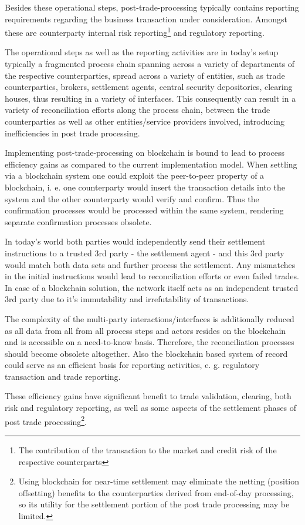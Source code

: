 Besides these operational steps, post-trade-processing typically contains reporting requirements regarding the business transaction under consideration. Amongst these are counterparty internal risk reporting\footnote{The contribution of the transaction to the market and credit risk of the respective counterparts} and regulatory reporting. 

The operational steps as well as the reporting activities are in today’s setup typically a fragmented process chain spanning across a variety of departments of the respective counterparties, spread across a variety of entities, such as trade counterparties, brokers, settlement agents, central security depositories, clearing houses, thus resulting in a variety of interfaces. This consequently can result in a variety of reconciliation efforts along the process chain, between the trade counterparties as well as other entities/service providers involved, introducing inefficiencies in post trade processing.

Implementing post-trade-processing on blockchain is bound to lead to process efficiency gains as compared to the current implementation model. When settling via a blockchain system one could exploit the peer-to-peer property of a blockchain, i. e. one counterparty would insert the transaction details into the system and the other counterparty would verify and confirm.  Thus the confirmation processes would be processed within the same system, rendering separate confirmation processes obsolete.

In today’s world both parties would independently send their settlement instructions to a trusted 3rd party - the settlement agent - and this 3rd party would match both data sets and further process the settlement. Any mismatches in the initial instructions would lead to reconciliation efforts or even failed trades. In case of a blockchain solution, the network itself acts as an independent trusted 3rd party due to it's immutability and irrefutability of transactions.

The complexity of the multi-party interactions/interfaces is additionally reduced as all data from all from all process steps and actors resides on the blockchain and is accessible on a need-to-know basis. Therefore, the reconciliation processes should become obsolete altogether. Also the blockchain based system of record could serve as an efficient basis for reporting activities, e. g. regulatory transaction and trade reporting.

These efficiency gains have significant benefit to trade validation, clearing, both risk and regulatory reporting, as well as some aspects of the settlement phases of post trade processing\footnote{Using blockchain for near-time settlement may eliminate the netting (position offsetting) benefits to the counterparties derived from end-of-day processing, so its utility for the settlement portion of the post trade processing may be limited.}.

